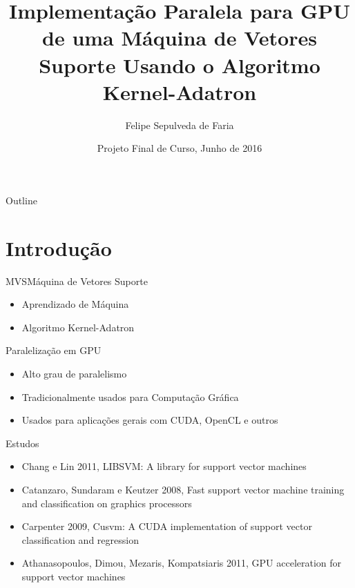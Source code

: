 \documentclass{beamer}
\title{Implementação Paralela para GPU de uma Máquina de Vetores Suporte Usando o Algoritmo Kernel-Adatron}
\author{Felipe Sepulveda de Faria}
\institute[Universidade Federal do Rio de Janeiro]
{
  Departamento de Ciência da Computação\\
  Universidade Federal do Rio de Janeiro
}
\date{Projeto Final de Curso, Junho de 2016}
\begin{document}
\begin{frame}
  \titlepage
\end{frame}

\begin{frame}{Outline}
  \tableofcontents
\end{frame}

\section{Introdução}

\begin{frame}{MVS}{Máquina de Vetores Suporte}
  \begin{itemize}
  \item {
    Aprendizado de Máquina
  }
  \item {
    Algoritmo Kernel-Adatron
  }
  \end{itemize}
\end{frame}

\begin{frame}{Paralelização em GPU}
  \begin{itemize}
  \item {
    Alto grau de paralelismo
  }
  \item {   
    Tradicionalmente usados para Computação Gráfica
  }
  \item {
    Usados para aplicações gerais com CUDA, OpenCL e outros
  }
  \end{itemize}
\end{frame}

\begin{frame}{Estudos}
  \begin{itemize}
  \item {
    Chang e Lin 2011, LIBSVM: A library for support vector machines
  }
  \item {   
    Catanzaro, Sundaram e Keutzer 2008, Fast support vector machine training and classification on graphics processors
  }
  \item {
    Carpenter 2009, Cusvm: A CUDA implementation of support vector classification and regression
  }
  \item {
    Athanasopoulos, Dimou, Mezaris, Kompatsiaris 2011, GPU acceleration for support vector machines
  }
  \end{itemize}
\end{frame}
\end{document}

